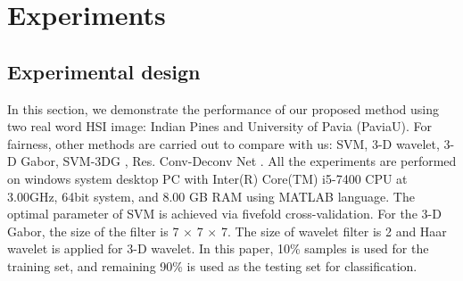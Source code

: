 \documentclass{ws-ijwmip}
\begin{document}
%



\section{Experiments}\label{sec:experiment}
\subsection{Experimental design}



In this section, we demonstrate the performance of our proposed method using two real word HSI image: Indian Pines and University of Pavia (PaviaU). For fairness, other methods are carried out to compare with us: SVM\cite{37}, 3-D wavelet\cite{29}, 3-D Gabor\cite{38}, SVM-3DG \cite{40}, Res. Conv-Deconv Net \cite{41}. All the experiments are performed on windows system desktop PC with Inter(R) Core(TM) i5-7400 CPU at 3.00GHz, 64bit system, and 8.00 GB RAM using MATLAB language. The optimal parameter of SVM is achieved via fivefold cross-validation. For the 3-D Gabor, the size of the filter is 7 $\times$ 7 $\times$ 7. The size of wavelet filter is 2 and Haar wavelet is applied for 3-D wavelet. In this paper, 10\% samples is used for the training set, and remaining 90\% is used as the testing set for classification.
\end{document}
